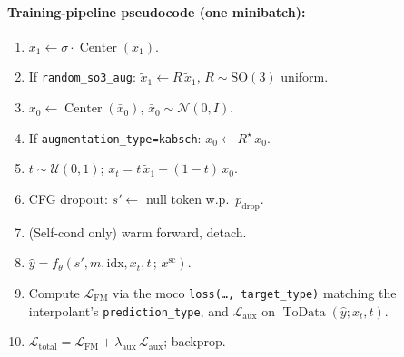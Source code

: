 \documentclass[11pt]{article}
\begin{document}
\paragraph{Training-pipeline pseudocode (one minibatch):}
\begin{enumerate}\itemsep -1pt
\item $\tilde x_1 \leftarrow \sigma\cdot\operatorname{Center}(x_1)$.
\item If \texttt{random\_so3\_aug}: $\tilde x_1 \leftarrow R\,\tilde x_1$, $R \sim \mathrm{SO}(3)$ uniform.
\item $x_0 \leftarrow \operatorname{Center}(\bar x_0)$, $\bar x_0 \sim \mathcal{N}(0, I)$.
\item If \texttt{augmentation\_type=kabsch}: $x_0 \leftarrow R^\star \, x_0$.
\item $t \sim \mathcal{U}(0,1)$; $x_t = t\,\tilde x_1 + (1-t)\,x_0$.
\item CFG dropout: $s' \leftarrow $ null token w.p.\ $p_{\text{drop}}$.
\item (Self-cond only) warm forward, detach.
\item $\hat{y} = f_\theta(s', m, \text{idx}, x_t, t \,;\, x^{\text{sc}})$.
\item Compute $\mathcal{L}_\text{FM}$ via the moco \texttt{loss(\dots, target\_type)} matching the interpolant's \texttt{prediction\_type}, and $\mathcal{L}_\text{aux}$ on $\operatorname{ToData}(\hat{y}; x_t, t)$.
\item $\mathcal{L}_\text{total} = \mathcal{L}_\text{FM} + \lambda_\text{aux}\,\mathcal{L}_\text{aux}$; backprop.
\end{enumerate}
\end{document}
